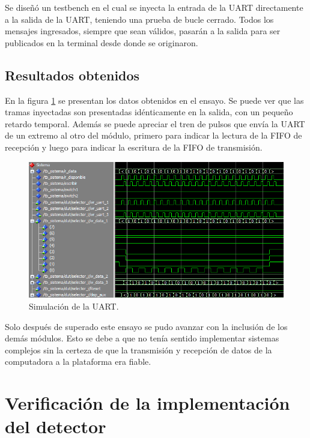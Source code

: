 		Se diseñó un testbench en el cual se inyecta la entrada de la UART directamente a la salida de la UART, teniendo una prueba de bucle cerrado. Todos los mensajes ingresados, siempre que sean válidos, pasarán a la salida para ser publicados en la terminal desde donde se originaron.
						
	\subsection{Resultados obtenidos}
				
		En la figura \ref{fig:Test_UART} se presentan los datos obtenidos en el ensayo. Se puede ver que las tramas inyectadas son presentadas idénticamente en la salida, con un pequeño retardo temporal. Además se puede apreciar el tren de pulsos que envía la UART de un extremo al otro del módulo, primero para indicar la lectura de la FIFO de recepción y luego para indicar la escritura de la FIFO de transmisión.
		
		\begin{figure}[h]
		\centering
		\includegraphics[scale=0.7]{./Figures/Test/UART}
			\caption{Simulación de la UART.}
			\label{fig:Test_UART}
		\end{figure}
			
		\vspace{10cm}
			
		Solo después de superado este ensayo se pudo avanzar con la inclusión de los demás módulos. Esto se debe a que no tenía sentido implementar sistemas complejos sin la certeza de que la transmisión y recepción de datos de la computadora a la plataforma era fiable. %
	
\section{Verificación de la implementación del detector}

